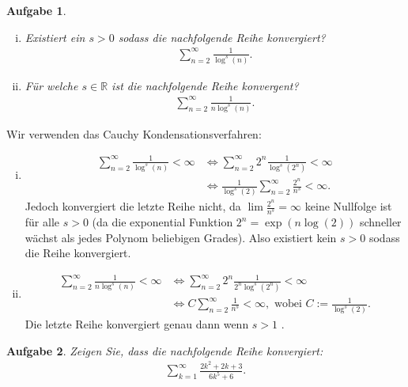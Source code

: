 \documentclass[a4paper, 20]{exam}
\newtheorem{ex}{Aufgabe}
\begin{document}
\begin{ex} \ \begin{enumerate}[i)]
\item Existiert ein $s >0$ sodass die nachfolgende Reihe konvergiert?
\begin{align*}
\sum_{n=2}^\infty \frac{1}{\log^s(n)}.
\end{align*}
\item Für welche $s \in \mathbb{R}$ ist die nachfolgende Reihe konvergent?
\begin{align*}
\sum_{n=2}^\infty \frac{1}{n \log^s (n) }.
\end{align*}
\end{enumerate}

\end{ex}

\begin{solution} Wir verwenden das Cauchy Kondensationsverfahren:
\begin{enumerate}[i)]
\item 
\begin{align*}
\sum_{n=2}^\infty \frac{1}{\log^s(n)}< \infty &\iff \sum_{n=2} ^\infty  2^n \frac{1}{\log^s(2^n)}< \infty  \\
& \iff \frac{1}{\log^s(2)} \sum_{n=2}^\infty \frac{2^n}{n^s} < \infty.
\end{align*}
Jedoch konvergiert die letzte Reihe nicht, da $\lim \frac{2^n }{n^s} = \infty$ keine Nullfolge ist für alle $s >0$ (da die exponential Funktion $2^n= \exp(n \log(2))$ schneller wächst als jedes Polynom beliebigen Grades). Also existiert kein $s>0$ sodass die Reihe konvergiert. 
\item
\begin{align*}
\sum_{n=2}^\infty \frac{1}{n \log^s(n)}< \infty &\iff \sum_{n=2}^\infty 2^n \frac{1}{2^n\log^s(2^n)}< \infty \\
& \iff C\sum_{n=2}^\infty \frac{1}{n^s}< \infty, \text{ wobei } C:= \frac{1}{\log^s(2)}.
\end{align*}
Die letzte Reihe konvergiert genau dann wenn $s > 1$ .
\end{enumerate}

\end{solution}


\begin{ex} Zeigen Sie, dass die nachfolgende Reihe konvergiert:
\begin{align*}
 \sum_{k=1}^\infty \frac{2k^2+2k+3}{6k^5+6}.
\end{align*}
\end{ex}
\end{document}
